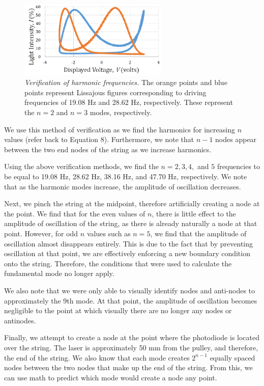 \documentclass[twoside,twocolumn]{article}
\begin{document}
\begin{figure}[!htbp]
    \centering
    \includegraphics[width=2.8in]{Lissajous.png}
    \caption{\textit{Verification of harmonic frequencies.} The orange points and blue points represent Lissajous figures corresponding to driving frequencies of 19.08 Hz and 28.62 Hz, respectively. These represent the $n=2$ and $n=3$ modes, respectively.}
\end{figure}

\noindent We use this method of verification as we find the harmonics for increasing $n$ values (refer back to Equation 8). Furthermore, we note that $n-1$ nodes appear between the two end nodes of the string as we increase harmonics.

\noindent Using the above verification methods, we find the $n = 2, 3, 4,$ and $5$ frequencies to be equal to 19.08 Hz, 28.62 Hz, 38.16 Hz, and 47.70 Hz, respectively. We note that as the harmonic modes increase, the amplitude of oscillation decreases.

\noindent Next, we pinch the string at the midpoint, therefore artificially creating a node at the point. We find that for the even values of $n$, there is little effect to the amplitude of oscillation of the string, as there is already naturally a node at that point. However, for odd $n$ values such as $n=5$, we find that the amplitude of oscillation almost disappears entirely. This is due to the fact that by preventing oscillation at that point, we are effectively enforcing a new boundary condition onto the string. Therefore, the conditions that were used to calculate the fundamental mode no longer apply.

\noindent We also note that we were only able to visually identify nodes and anti-nodes to approximately the 9th mode. At that point, the amplitude of oscillation becomes negligible to the point at which visually there are no longer any nodes or antinodes.

\noindent Finally, we attempt to create a node at the point where the photodiode is located over the string. The laser is approximately 50 mm from the pulley, and therefore, the end of the string. We also know that each mode creates $2^{n-1}$ equally spaced nodes between the two nodes that make up the end of the string. From this, we can use math to predict which mode would create a node any point.
\end{document}
